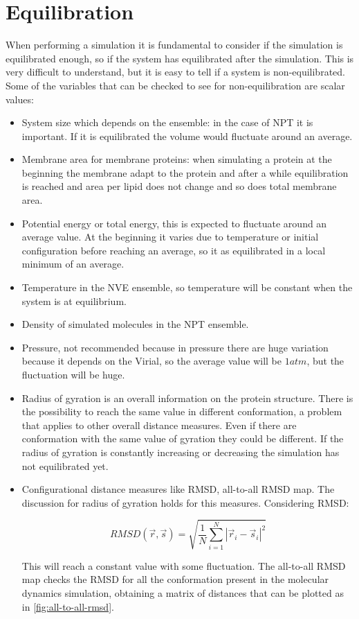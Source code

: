 \section{Equilibration}
When performing a simulation it is fundamental to consider if the simulation is equilibrated enough, so if the system has equilibrated after the simulation.
This is very difficult to understand, but it is easy to tell if a system is non-equilibrated.
Some of the variables that can be checked to see for non-equilibration are scalar values:

\begin{multicols}{2}
	\begin{itemize}
		\item System size which depends on the ensemble: in the case of NPT it is important.
			If it is equilibrated the volume would fluctuate around an average.
		\item Membrane area for membrane proteins: when simulating a protein at the beginning the membrane adapt to the protein and after a while equilibration is reached and area per lipid does not change and so does total membrane area.
		\item Potential energy or total energy, this is expected to fluctuate around an average value.
			At the beginning it varies due to temperature or initial configuration before reaching an average, so it as equilibrated in a local minimum of an average.
		\item Temperature in the NVE ensemble, so temperature will be constant when the system is at equilibrium.
		\item Density of simulated molecules in the NPT ensemble.
		\item Pressure, not recommended because in pressure there are huge variation because it depends on the Virial, so the average value will be $1 atm$, but the fluctuation will be huge.
		\item Radius of gyration is an overall information on the protein structure.
			There is the possibility to reach the same value in different conformation, a problem that applies to other overall distance measures.
			Even if there are conformation with the same value of gyration they could be different.
			If the radius of gyration is constantly increasing or decreasing the simulation has not equilibrated yet.
		\item Configurational distance measures like RMSD, all-to-all RMSD map.
			The discussion for radius of gyration holds for this measures.
			Considering RMSD:

			$$RMSD(\vec{r}, \vec{s}) = \sqrt{\frac{1}{N}\sum\limits_{i=1}^N|\vec{r}_i-\vec{s}_i|^2}$$

			This will reach a constant value with some fluctuation.
			The all-to-all RMSD map checks the RMSD for all the conformation present in the molecular dynamics simulation, obtaining a matrix of distances that can be plotted as in \ref{fig:all-to-all-rmsd}.
	\end{itemize}
\end{multicols}

